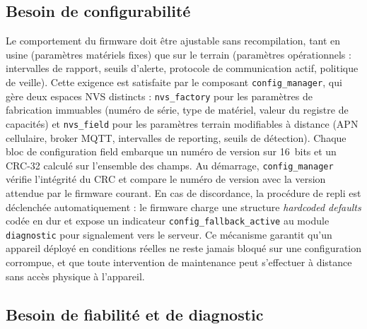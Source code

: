 \subsection{Besoin de configurabilité}
\label{subsec:besoin_config}

Le comportement du firmware doit être ajustable sans recompilation,
tant en usine (paramètres matériels fixes) que sur le terrain
(paramètres opérationnels : intervalles de rapport, seuils d'alerte,
protocole de communication actif, politique de veille). Cette exigence
est satisfaite par le composant \texttt{config\_manager}, qui gère
deux espaces NVS distincts : \texttt{nvs\_factory} pour les paramètres
de fabrication immuables (numéro de série, type de matériel, valeur
du registre de capacités) et \texttt{nvs\_field} pour les paramètres
terrain modifiables à distance (APN cellulaire, broker MQTT, intervalles
de reporting, seuils de détection). Chaque bloc de configuration field
embarque un numéro de version sur 16~bits et un CRC-32 calculé sur
l'ensemble des champs. Au démarrage, \texttt{config\_manager} vérifie
l'intégrité du CRC et compare le numéro de version avec la version
attendue par le firmware courant. En cas de discordance, la procédure
de repli est déclenchée automatiquement : le firmware charge une
structure \textit{hardcoded defaults} codée en dur et expose un
indicateur \texttt{config\_fallback\_active} au module
\texttt{diagnostic} pour signalement vers le serveur. Ce mécanisme
garantit qu'un appareil déployé en conditions réelles ne reste jamais
bloqué sur une configuration corrompue, et que toute intervention de
maintenance peut s'effectuer à distance sans accès physique à l'appareil.

\subsection{Besoin de fiabilité et de diagnostic}
\label{subsec:besoin_fiab}

